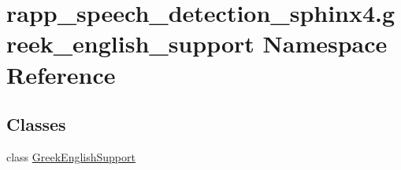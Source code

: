 \hypertarget{namespacerapp__speech__detection__sphinx4_1_1greek__english__support}{\section{rapp\-\_\-speech\-\_\-detection\-\_\-sphinx4.\-greek\-\_\-english\-\_\-support Namespace Reference}
\label{namespacerapp__speech__detection__sphinx4_1_1greek__english__support}
}
\subsection*{Classes}
\begin{DoxyCompactItemize}
\item 
class \hyperlink{classrapp__speech__detection__sphinx4_1_1greek__english__support_1_1GreekEnglishSupport}{Greek\-English\-Support}
\end{DoxyCompactItemize}
